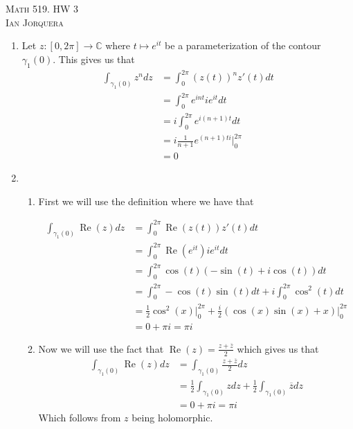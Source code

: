 \documentclass[12pt]{amsart}
\theoremstyle{definition}
\newcommand{\C}{\mathbb{C}}
\DeclareMathOperator{\Real}{\mathrm{Re}}
\newcommand{\ra}{\rightarrow}
\begin{document}
\begin{center}
    \textsc{Math 519. HW 3\\ Ian Jorquera}
\end{center}
\vspace{1em}

\begin{enumerate}

\item 
Let $z:[0,2\pi]\ra \C$ where $t\mapsto e^{it}$ be a parameterization of the contour $\gamma_1(0)$. This gives us that 
\begin{align*}
    \int_{\gamma_1(0)}z^ndz&=\int_{0}^{2\pi} (z(t))^nz'(t)dt\\
    &= \int_{0}^{2\pi} e^{int}ie^{it}dt\\
    &= i\int_{0}^{2\pi} e^{i(n+1)t}dt\\
    &= i \frac{1}{n+1}e^{(n+1)ti}\Big|_{0}^{2\pi}\\
    &= 0
\end{align*}

\item 
\begin{enumerate}
    \item First we will use the definition where we have that 

    \begin{align*}
        \int_{\gamma_1(0)}\Real(z)dz&=\int_{0}^{2\pi} \Real(z(t))z'(t)dt\\
        &= \int_{0}^{2\pi} \Real(e^{it})ie^{it}dt\\
        &= \int_{0}^{2\pi} \cos(t)(-\sin(t)+i\cos(t))dt\\
        &= \int_{0}^{2\pi} -\cos(t)\sin(t)dt+i\int_{0}^{2\pi}\cos^2(t)dt\\
        &= \frac{1}{2}\cos^2(x)\Big|_{0}^{2\pi}+\frac{i}{2}(\cos(x)\sin(x)+x)\Big|_{0}^{2\pi}\\
        &=0+\pi i=\pi i
    \end{align*}

    \item Now we will use the fact that $\Real(z)=\frac{z+\overline{z}}{2}$ which gives us that 
    \begin{align*}
        \int_{\gamma_1(0)}\Real(z)dz&=\int_{\gamma_1(0)}\frac{z+\overline{z}}{2}dz\\
        &=\frac{1}{2}\int_{\gamma_1(0)}zdz+\frac{1}{2}\int_{\gamma_1(0)}\overline{z}dz\\
        &=0+\pi i=\pi i
    \end{align*}
    Which follows from $z$ being holomorphic.\\


\end{enumerate}
\end{enumerate}
\end{document}
